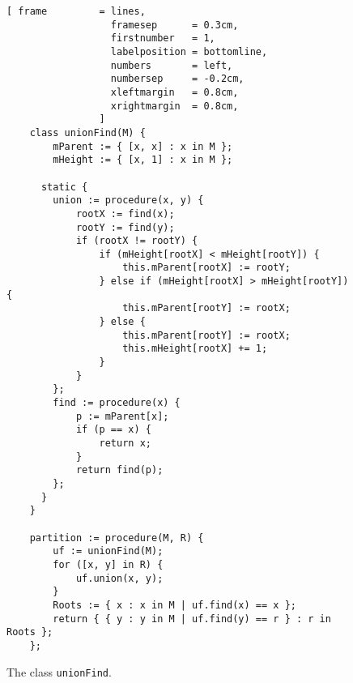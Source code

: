 \begin{figure}[!ht]
\centering
\begin{Verbatim}[ frame         = lines, 
                  framesep      = 0.3cm, 
                  firstnumber   = 1,
                  labelposition = bottomline,
                  numbers       = left,
                  numbersep     = -0.2cm,
                  xleftmargin   = 0.8cm,
                  xrightmargin  = 0.8cm,
                ]
    class unionFind(M) {
        mParent := { [x, x] : x in M };
        mHeight := { [x, 1] : x in M };
        
      static {
        union := procedure(x, y) {
            rootX := find(x);
            rootY := find(y);
            if (rootX != rootY) {
                if (mHeight[rootX] < mHeight[rootY]) {
                    this.mParent[rootX] := rootY;  
                } else if (mHeight[rootX] > mHeight[rootY]) {
                    this.mParent[rootY] := rootX;  
                } else {
                    this.mParent[rootY] := rootX;  
                    this.mHeight[rootX] += 1;
                }
            }
        };
        find := procedure(x) {
            p := mParent[x]; 
            if (p == x) {
                return x;
            }
            return find(p);
        };
      }
    }

    partition := procedure(M, R) {
        uf := unionFind(M);
        for ([x, y] in R) {
            uf.union(x, y);
        }
        Roots := { x : x in M | uf.find(x) == x };
        return { { y : y in M | uf.find(y) == r } : r in Roots };
    };
\end{Verbatim}
\vspace*{-0.3cm}
\caption{The class \texttt{unionFind}.}
\label{fig:union-find-oo.stlx}
\end{figure}

